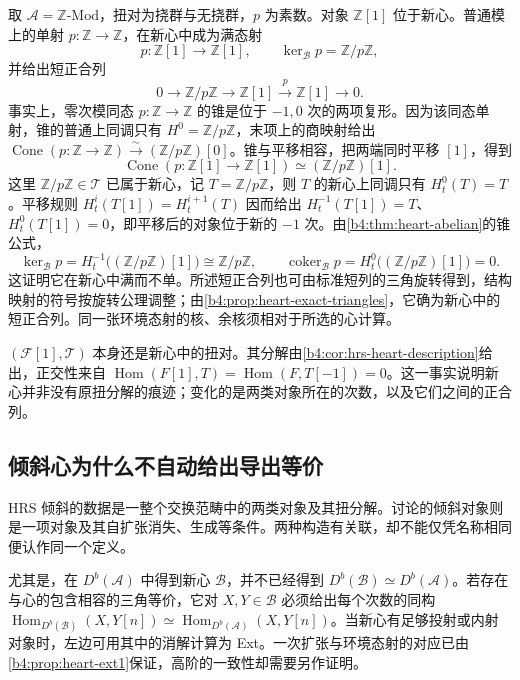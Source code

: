 \begin{example}\label{b4:exm:hrs-integer-multiplication}
	取 \(\mathcal A=\mathbb Z\text{-}\mathrm{Mod}\)，扭对为挠群与无挠群，\(p\) 为素数。对象 \(\mathbb Z[1]\) 位于新心。普通模上的单射 \(p:\mathbb Z\to\mathbb Z\)，在新心中成为满态射
	\[
		p:\mathbb Z[1]\longrightarrow\mathbb Z[1],\qquad \ker_{\mathcal B}p=\mathbb Z/p\mathbb Z,
	\]
	并给出短正合列
	\[
		0\longrightarrow\mathbb Z/p\mathbb Z\longrightarrow\mathbb Z[1] \xrightarrow{p}\mathbb Z[1]\longrightarrow0.
	\]
	事实上，零次模同态 \(p:\mathbb Z\to\mathbb Z\) 的锥是位于 \(-1,0\) 次的两项复形。因为该同态单射，锥的普通上同调只有 \(H^0=\mathbb Z/p\mathbb Z\)，末项上的商映射给出 \(\operatorname{Cone}(p:\mathbb Z\to\mathbb Z)\xrightarrow{\sim}(\mathbb Z/p\mathbb Z)[0]\)。锥与平移相容，把两端同时平移 \([1]\)，得到
	\[
		\operatorname{Cone}(p:\mathbb Z[1]\longrightarrow\mathbb Z[1]) \simeq(\mathbb Z/p\mathbb Z)[1].
	\]
	这里 \(\mathbb Z/p\mathbb Z\in\mathcal T\) 已属于新心，记 \(T=\mathbb Z/p\mathbb Z\)，则 \(T\) 的新心上同调只有 \(H_t^0(T)=T\)。平移规则 \(H_t^i(T[1])=H_t^{i+1}(T)\) 因而给出 \(H_t^{-1}(T[1])=T\)、\(H_t^0(T[1])=0\)，即平移后的对象位于新的 \(-1\) 次。由\cref{b4:thm:heart-abelian}的锥公式，
	\[
		\ker_{\mathcal B}p=H_t^{-1}\bigl((\mathbb Z/p\mathbb Z)[1]\bigr) \cong\mathbb Z/p\mathbb Z,\qquad \operatorname{coker}_{\mathcal B}p=H_t^0\bigl((\mathbb Z/p\mathbb Z)[1]\bigr)=0.
	\]
	这证明它在新心中满而不单。所述短正合列也可由标准短列的三角旋转得到，结构映射的符号按旋转公理调整；由\cref{b4:prop:heart-exact-triangles}，它确为新心中的短正合列。同一张环境态射的核、余核须相对于所选的心计算。
\end{example}

\((\mathcal F[1],\mathcal T)\) 本身还是新心中的扭对。其分解由\cref{b4:cor:hrs-heart-description}给出，正交性来自 \(\operatorname{Hom}(F[1],T)=\operatorname{Hom}(F,T[-1])=0\)。这一事实说明新心并非没有原扭分解的痕迹；变化的是两类对象所在的次数，以及它们之间的正合列。

\subsection{倾斜心为什么不自动给出导出等价}
\label{b4:subsec:1904:05}

HRS 倾斜的数据是一整个交换范畴中的两类对象及其扭分解。讨论的倾斜对象则是一项对象及其自扩张消失、生成等条件。两种构造有关联，却不能仅凭名称相同便认作同一个定义。

\ProseParagraphBreak
尤其是，在 \(D^b(\mathcal A)\) 中得到新心 \(\mathcal B\)，并不已经得到 \(D^b(\mathcal B)\simeq D^b(\mathcal A)\)。若存在与心的包含相容的三角等价，它对 \(X,Y\in\mathcal B\) 必须给出每个次数的同构 \(\operatorname{Hom}_{D^b(\mathcal B)}(X,Y[n])\simeq\operatorname{Hom}_{D^b(\mathcal A)}(X,Y[n])\)。当新心有足够投射或内射对象时，左边可用其中的消解计算为 Ext。一次扩张与环境态射的对应已由\cref{b4:prop:heart-ext1}保证，高阶的一致性却需要另作证明。

